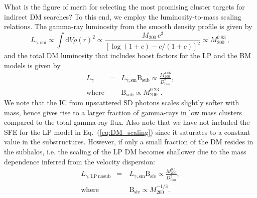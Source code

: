 \documentclass[10pt,aps,pra,reprint,amsmath,amsfonts,amssymb,showpacs,nofootinbib,floatfix]{revtex4-1}
\newcommand{\rmn}{\mathrm}
\newcommand{\sub}{\rmn{sub}}
\newcommand{\B}{\rmn{B}}
\newcommand{\sm}{\rmn{sm}}
\newcommand{\dd}{\rmn{d}}
\newcommand{\mvir}{M_{200}}
\begin{document}
What is the figure of merit for selecting the most promising cluster
targets for indirect DM searches? To this end, we employ the
luminosity-to-mass scaling relations. The gamma-ray luminosity from
the smooth density profile is given by \cite{2009PhRvL.103r1302P}
\begin{equation}
L_{\gamma,\sm} \propto \int \dd V \rho(r)^2 \propto \frac{M_{200}\,c^3}
{\left[\log\left(1+c\right)-c/(1+c)\right]^2} \propto \mvir^{0.83}\,,
\end{equation}
and the total DM luminosity that includes boost factors for the LP and
the BM models is given by
\begin{eqnarray}
\label{eq:DM_scaling}
L_{\gamma} &=& L_{\gamma,\rmn{sm}} \B_\rmn{sub} \propto \frac{\mvir^{1.06}}{D_\rmn{lum}^2},\\
\rmn{where} & &\B_\sub \propto \mvir^{0.23}\,.
\end{eqnarray}
We note that the IC from upscattered SD photons scales slightly softer
with mass, hence gives rise to a larger fraction of gamma-rays in low
mass clusters compared to the total gamma-ray flux. Also note that we
have not included the SFE for the LP model in
Eq.~(\ref{eq:DM_scaling}) since it saturates to a constant value in
the substructures. However, if only a small fraction of the DM resides
in the subhalos, i.e. the scaling of the LP DM becomes shallower due
to the mass dependence inferred from the velocity dispersion:
\begin{eqnarray}
L_{\gamma,\rmn{LP~nosub}} &=& L_{\gamma,\rmn{sm}} \B_\rmn{sfe}
\propto \frac{\mvir^{0.5}}{D_\rmn{lum}^2},\\
\rmn{where} &\quad&\B_\rmn{sfe} \propto \mvir^{-1/3}.
\end{eqnarray}
\end{document}
